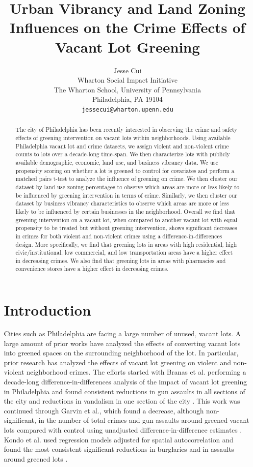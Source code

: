\documentclass{article}
\title{Urban Vibrancy and Land Zoning Influences on the Crime Effects of Vacant Lot Greening}
\author{
  Jesse Cui \\
  Wharton Social Impact Initiative\\
  The Wharton School, University of Pennsylvania\\
  Philadelphia, PA 19104 \\
  \texttt{jessecui@wharton.upenn.edu} \\
}
\begin{document}
\maketitle

\begin{abstract}
The city of Philadelphia has been recently interested in observing the crime and safety effects of greening intervention on vacant lots within neighborhoods. Using available Philadelphia vacant lot and crime datasets, we assign violent and non-violent crime counts to lots over a decade-long time-span. We then characterize lots with publicly available demographic, economic, land use, and business vibrancy data. We use propensity scoring on whether a lot is greened to control for covariates and perform a matched pairs t-test to analyze the influence of greening on crime. We then cluster our dataset by land use zoning percentages to observe which areas are more or less likely to be influenced by greening intervention in terms of crime. Similarly, we then cluster our dataset by business vibrancy characteristics to observe which areas are more or less likely to be influenced by certain businesses in the neighborhood. Overall we find that greening intervention on a vacant lot, when compared to another vacant lot with equal propensity to be treated but without greening intervention, shows significant decreases in crimes for both violent and non-violent crimes using a difference-in-differences design. More specifically, we find that greening lots in areas with high residential, high civic/institutional, low commercial, and low transportation areas have a higher effect in decreasing crimes. We also find that greening lots in areas with pharmacies and convenience stores have a higher effect in decreasing crimes.
\end{abstract}




\section{Introduction}
Cities such as Philadelphia are facing a large number of unused, vacant lots. A large amount of prior works have analyzed the effects of converting vacant lots into greened spaces on the surrounding neighborhood of the lot. In particular, prior research has analyzed the effects of vacant lot greening on violent and non-violent neighborhood crimes. The efforts started with Branas et al. performing a decade-long difference-in-differences analysis of the impact of vacant lot greening in Philadelphia and found consistent reductions in gun assaults in all sections of the city and reductions in vandalism in one section of the city \cite{branas-1}.  This work was continued through Garvin et al., which found a decrease, although non-significant, in the number of total crimes and gun assaults around greened vacant lots compared with control using unadjusted difference-in-difference estimates \cite{garvin-1}. Kondo et al. used regression models adjusted for spatial autocorrelation and found the most consistent significant reductions in burglaries and in assaults around greened lots \cite{kondo-1}.
\end{document}
